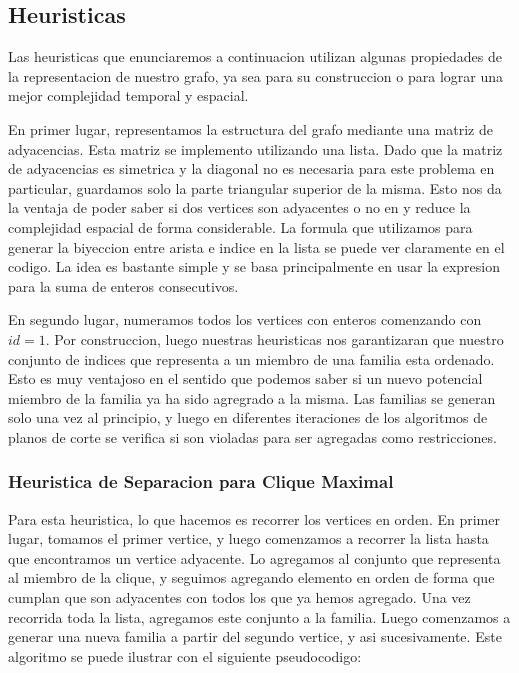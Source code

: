 \subsection{Heuristicas}

Las heuristicas que enunciaremos a continuacion utilizan algunas propiedades de la representacion de nuestro grafo, ya sea para su construccion o para lograr una mejor complejidad temporal y espacial.

En primer lugar, representamos la estructura del grafo mediante una matriz de adyacencias. Esta matriz se implemento utilizando una lista. Dado que la matriz de adyacencias es simetrica y la diagonal no es necesaria para este problema en particular, guardamos solo la parte triangular superior de la misma. Esto nos da la ventaja de poder saber si dos vertices son adyacentes o no en  y reduce la complejidad espacial de forma considerable. La formula que utilizamos para generar la biyeccion entre arista e indice en la lista se puede ver claramente en el codigo. La idea es bastante simple y se basa principalmente en usar la expresion para la suma de enteros consecutivos.

En segundo lugar, numeramos todos los vertices con enteros comenzando con $id = 1$. Por construccion, luego nuestras heuristicas nos garantizaran que nuestro conjunto de indices que representa a un miembro de una familia esta ordenado. Esto es muy ventajoso en el sentido que podemos saber si un nuevo potencial miembro de la familia ya ha sido agregrado a la misma. Las familias se generan solo una vez al principio, y luego en diferentes iteraciones de los algoritmos de planos de corte se verifica si son violadas para ser agregadas como restricciones.

\pagebreak

\subsubsection{Heuristica de Separacion para Clique Maximal}

Para esta heuristica, lo que hacemos es recorrer los vertices en orden. En primer lugar, tomamos el primer vertice, y luego comenzamos a recorrer la lista hasta que encontramos un vertice adyacente. Lo agregamos al conjunto que representa al miembro de la clique, y seguimos agregando elemento en orden de forma que cumplan que son adyacentes con todos los que ya hemos agregado. Una vez recorrida toda la lista, agregamos este conjunto a la familia. Luego comenzamos a generar una nueva familia a partir del segundo vertice, y asi sucesivamente. Este algoritmo se puede ilustrar con el siguiente pseudocodigo:

